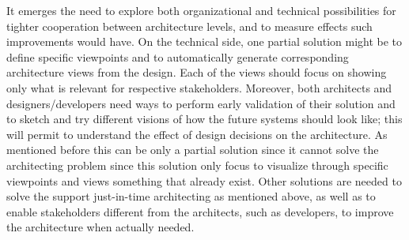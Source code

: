 It emerges the need to explore both organizational and technical
possibilities for tighter cooperation between architecture levels, and to
measure effects such improvements would have. On the technical side, one partial solution might be %
to define specific viewpoints and to automatically generate corresponding architecture views from the design. 
Each of the  views should focus on 
showing only what is relevant for respective stakeholders. Moreover,
both architects and designers/developers need ways to perform early validation
of their solution and to sketch and try different visions of how the future
systems should look like; this will permit to understand the effect of design decisions on
the architecture. As mentioned before this can be only a partial solution since it cannot 
solve the architecting problem since this solution only focus to visualize through specific viewpoints and views something that already exist. Other solutions are needed to solve the support just-in-time %
architecting as mentioned above, as well as to enable stakeholders different from the architects, such as developers, to improve the architecture when actually needed.


